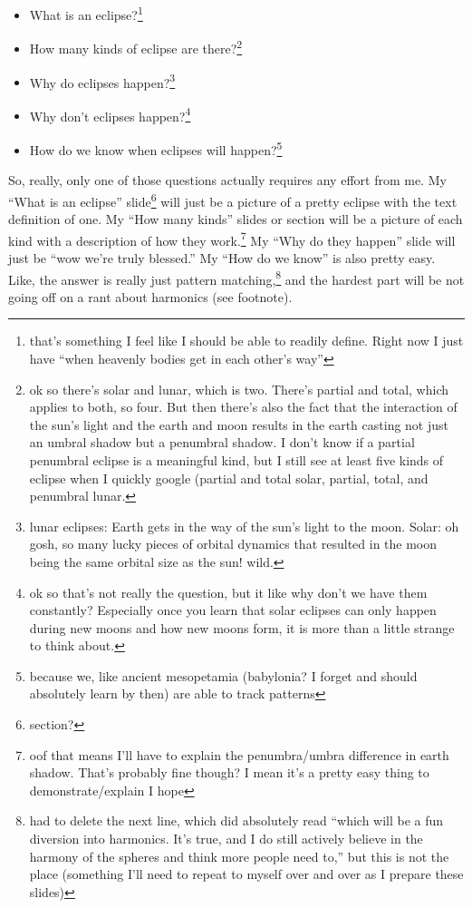 \documentclass[12pt]{article}[titlepage]
\newcommand{\say}[1]{``#1''}
\newcommand{\1}{\={a}}
\newcommand{\2}{\={e}}
\newcommand{\3}{\={\i}}
\newcommand{\4}{\=o}
\newcommand{\5}{\=u}
\newcommand{\6}{\={A}}
\renewcommand{\,}{\textsuperscript{,}}
\begin{document}
\begin{itemize}
\item What is an eclipse?\footnote{that's something I feel like I should be able to readily define. Right now I just have \say{when heavenly bodies get in each other's way}}
\item How many kinds of eclipse are there?\footnote{ok so there's solar and lunar, which is two. There's partial and total, which applies to both, so four. But then there's also the fact that the interaction of the sun's light and the earth and moon results in the earth casting not just an umbral shadow but a penumbral shadow. I don't know if a partial penumbral eclipse is a meaningful kind, but I still see at least five kinds of eclipse when I quickly google (partial and total solar, partial, total, and penumbral lunar.}
\item Why do eclipses happen?\footnote{lunar eclipses: Earth gets in the way of the sun's light to the moon. Solar: oh gosh, so many lucky pieces of orbital dynamics that resulted in the moon being the same orbital size as the sun! wild.}
\item Why don't eclipses happen?\footnote{ok so that's not really the question, but it like why don't we have them constantly? Especially once you learn that solar eclipses can only happen during new moons and how new moons form, it is more than a little strange to think about.}
\item How do we know when eclipses will happen?\footnote{because we, like ancient mesopetamia (babylonia? I forget and should absolutely learn by then) are able to track patterns}
\end{itemize}

So, really, only one of those questions actually requires any effort from me.
My \say{What is an eclipse} slide\footnote{section?} will just be a picture of a pretty eclipse with the text definition of one.
My \say{How many kinds} slides or section will be a picture of each kind with a description of how they work.\footnote{oof that means I'll have to explain the penumbra/umbra difference in earth shadow. That's probably fine though? I mean it's a pretty easy thing to demonstrate/explain I hope}
My \say{Why do they happen} slide will just be \say{wow we're truly blessed.}
My \say{How do we know} is also pretty easy.
Like, the answer is really just pattern matching,\footnote{had to delete the next line, which did absolutely read \say{which will be a fun diversion into harmonics. It's true, and I do still actively believe in the harmony of the spheres and think more people need to,} but this is not the place (something I'll need to repeat to myself over and over as I prepare these slides)} and the hardest part will be not going off on a rant about harmonics (see footnote).
\end{document}
